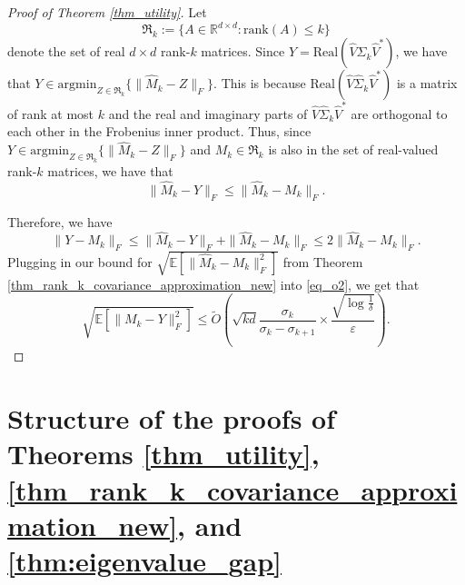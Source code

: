 \documentclass[11pt,letterpaper]{article}
\newcommand{\eps}{\varepsilon}
\begin{document}
\begin{proof}[Proof of Theorem \ref{thm_utility}]
Let $$\mathfrak{R}_k:= \{A \in \mathbb{R}^{d\times d}: \mathrm{rank}(A) \leq k\}$$ denote the set of real $d \times d$ rank-$k$ matrices.
%
 Since $Y = \mathrm{Real}(\hat{V} \hat{\Sigma}_k \hat{V}^\ast)$, we have that $Y \in \mathrm{argmin}_{Z \in \mathfrak{R}_k} \{\|\hat{M}_k-Z\|_F\}$.
%
This is because $\mathrm{Real}(\hat{V} \hat{\Sigma}_k \hat{V}^\ast)$ is a matrix of rank at most $k$ and the real and imaginary parts of $\hat{V} \hat{\Sigma}_k \hat{V}^\ast$ are orthogonal to each other in the Frobenius inner product. 
%
Thus, since $Y \in \mathrm{argmin}_{Z \in \mathfrak{R}_k} \{\|\hat{M}_k-Z\|_F\}$ and $M_k \in  \mathfrak{R}_k$ is also in the set of real-valued rank-$k$ matrices, we have that
\begin{equation*}
\|\hat{M}_k-Y\|_F \leq \|\hat{M}_k -  M_k\|_F.
\end{equation*}
%

\noindent
Therefore, we have
%
\begin{equation}\label{eq_o2}
\|Y - M_k\|_F \leq \|\hat{M}_k-Y\|_F + \|\hat{M}_k -  M_k\|_F \leq 2  \|\hat{M}_k -  M_k\|_F.
\end{equation}
%
Plugging in our bound for $\sqrt{\mathbb{E}[\|\hat{M}_k -  M_k\|_F^2]}$ from  Theorem \ref{thm_rank_k_covariance_approximation_new} into \eqref{eq_o2}, we get that
%
$$\sqrt{\mathbb{E}[\|M_k - Y\|_F^2]}  \leq \tilde{O}\left(\sqrt{kd} \frac{\sigma_k}{\sigma_k - \sigma_{k+1}} \times  \frac{\sqrt{\log\frac{1}{\delta}}}{\eps}\right).$$
\end{proof}

\section{Structure of the proofs of Theorems \ref{thm_utility}, \ref{thm_rank_k_covariance_approximation_new}, and \ref{thm:eigenvalue_gap}}
\end{document}

